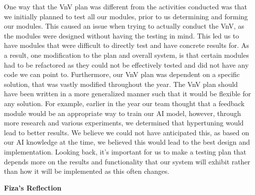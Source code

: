\documentclass[12pt, titlepage]{article}
\begin{document}
\begin{enumerate}
    One way that the VnV plan was different from the activities
    conducted was that we initially planned to test all our modules,
    prior to us determining and forming our modules.
    This caused an issue when trying to actually conduct the VnV, as
    the modules were designed without having the testing in mind.
    This led us to have modules that were difficult
    to directly test and have concrete results for. As a result, one
    modification to the plan and overall system, is that certain
    modules had to be refactored as they could not be
    effectively tested and did not have any code we can point to.
    Furthermore, our VnV plan was dependent on a specific solution,
    that was vastly modified throughout the year. The VnV plan should
    have been written in a more
    generalized manner such that it would be flexible for any
    solution. For example, earlier in the year our team thought that
    a feedback module would be an appropriate way to train
    our AI model, however, through more research and various
    experiments, we determined that hypertuning would lead to better
    results. We believe we could not have anticipated this, as based
    on our AI knowledge at the time, we believed this would lead to
    the best design and implementation. Looking back, it's important
    for us to make a testing plan that depends more on the results
    and functionality that our system will exhibit rather than how it
    will be implemented as this often changes.

\end{enumerate}

\textbf{Fiza's Reflection}
\end{document}
